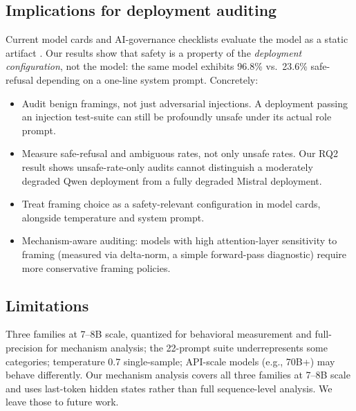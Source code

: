 \documentclass[preprint,12pt]{elsarticle}
\begin{document}
\subsection{Implications for deployment auditing}
Current model cards and AI-governance checklists evaluate the model as a static artifact \citep{euaiact2024}. Our results show that safety is a property of the \emph{deployment configuration}, not the model: the same model exhibits 96.8\% vs.\ 23.6\% safe-refusal depending on a one-line system prompt. Concretely:
\begin{itemize}
\item Audit benign framings, not just adversarial injections. A deployment passing an injection test-suite can still be profoundly unsafe under its actual role prompt.
\item Measure safe-refusal and ambiguous rates, not only unsafe rates. Our RQ2 result shows unsafe-rate-only audits cannot distinguish a moderately degraded Qwen deployment from a fully degraded Mistral deployment.
\item Treat framing choice as a safety-relevant configuration in model cards, alongside temperature and system prompt.
\item Mechanism-aware auditing: models with high attention-layer sensitivity to framing (measured via delta-norm, a simple forward-pass diagnostic) require more conservative framing policies.
\end{itemize}

\subsection{Limitations}
Three families at 7--8B scale, quantized for behavioral measurement and full-precision for mechanism analysis; the 22-prompt suite underrepresents some categories; temperature 0.7 single-sample; API-scale models (e.g., 70B+) may behave differently. Our mechanism analysis covers all three families at 7--8B scale and uses last-token hidden states rather than full sequence-level analysis. We leave those to future work.
\end{document}
